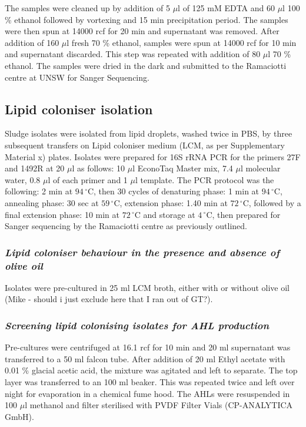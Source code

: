\documentclass[11pt]{article}
\begin{document}
The samples were cleaned up by addition of 5 $\mu$l of 125 mM EDTA and 60 $\mu$l 100 \% ethanol followed by vortexing and 15 min precipitation period. The samples were then spun at 14000 rcf for 20 min and supernatant was removed. After addition of 160 $\mu$l fresh 70 \% ethanol, samples were spun at 14000 rcf for 10 min and supernatant discarded. This step was repeated with addition of 80 $\mu$l 70 \% ethanol. The samples were dried in the dark and submitted to the Ramaciotti centre at UNSW for Sanger Sequencing.

\subsection{Lipid coloniser isolation}
Sludge isolates  were isolated from lipid droplets, washed twice in PBS, by three subsequent transfers on Lipid coloniser medium (LCM, as per Supplementary Material x) plates. Isolates were prepared for 16S rRNA PCR for the primers 27F and 1492R at 20 $\mu$l as follows: 10 $\mu$l EconoTaq Master mix, 7.4 $\mu$l molecular water, 0.8 $\mu$l of each primer and 1 $\mu$l template. The PCR protocol was the following: 2 min at $94\,^{\circ}\mathrm{C}$, then 30 cycles of denaturing phase: 1 min at $94\,^{\circ}\mathrm{C}$, annealing phase: 30 sec at  $59\,^{\circ}\mathrm{C}$, extension phase: 1.40 min at $72\,^{\circ}\mathrm{C}$, followed by a final extension phase: 10 min at $72\,^{\circ}\mathrm{C}$ and storage at $4\,^{\circ}\mathrm{C}$, then prepared for Sanger sequencing by the Ramaciotti centre as previously outlined.

\subsubsection{\emph{Lipid coloniser behaviour in the presence and absence of olive oil}}
Isolates were pre-cultured in 25 ml LCM broth, either with or without olive oil (Mike - should i just exclude here that I ran out of GT?). 

\subsubsection{\emph{Screening lipid colonising isolates for AHL production}}
Pre-cultures were centrifuged at 16.1 rcf for 10 min and 20 ml supernatant was transferred to a 50 ml falcon tube. After addition of 20 ml Ethyl acetate with 0.01 \% glacial acetic acid, the mixture was agitated and left to separate. The top  layer was transferred to an 100 ml beaker. This was repeated twice and left over night for evaporation in a chemical fume hood. The AHLs were resuspended in 100  $\mu$l methanol and filter sterilised with PVDF Filter Vials (CP-ANALYTICA GmbH). \\
\end{document}
